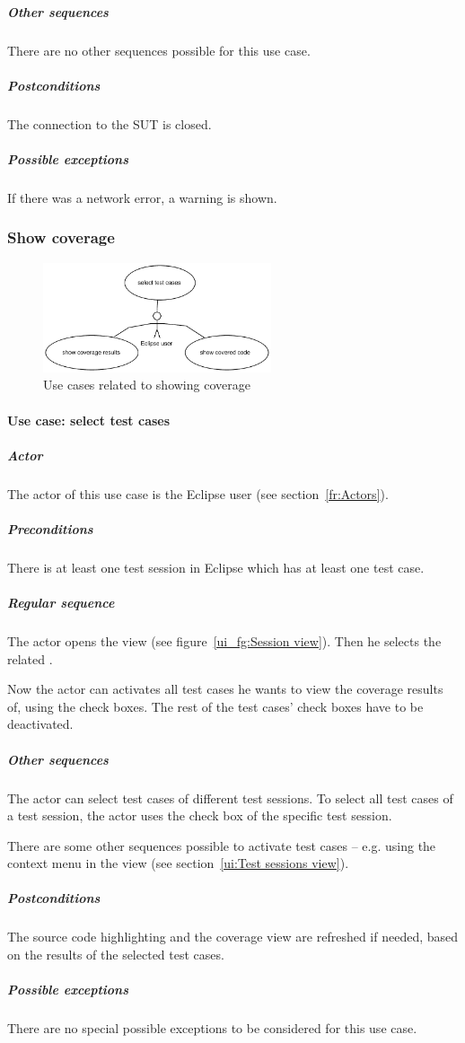 \subparagraph{Other sequences}
There are no other sequences possible for this use case.

\subparagraph{Postconditions} The connection to the SUT is closed.

\subparagraph{Possible exceptions} If there was a network error, a
warning is shown.


\clearpage
\subsubsection{Show coverage} \label{fr:Show coverage}
\begin{figure}[htp]
 \centering
 \includegraphics[width=0.6\textwidth]{images/Use_Case_Models/showcoverage}
 \caption{Use cases related to showing coverage}
 \label{fr_fg:Use cases related to showing coverage}
\end{figure}

\paragraph{Use case: select test cases} \label{fr:Use case: select test cases}
\subparagraph{Actor}
The actor of this use case is the Eclipse user (see section~\ref{fr:Actors}).
\subparagraph{Preconditions}
There is at least one test session in Eclipse which has at least one test case. 
\subparagraph{Regular sequence}
The actor opens the  view (see figure~\ref{ui_fg:Session view}). Then he selects the related .
\par
Now the actor can activates all test cases he wants to view the coverage results of, using the  check boxes. The rest of the test cases' check boxes have to be deactivated.
\subparagraph{Other sequences}
The actor can select test cases of different test sessions. To select all test cases of a test session, the actor uses the  check box of the specific test session.
\par
There are some other sequences possible to activate test cases -- e.g. using the context menu in the  view (see section~\ref{ui:Test sessions view}).
\subparagraph{Postconditions}
The source code highlighting and the coverage view are refreshed if needed, based on the results of the selected test cases.
\subparagraph{Possible exceptions}
There are no special possible exceptions to be considered for this use case.

